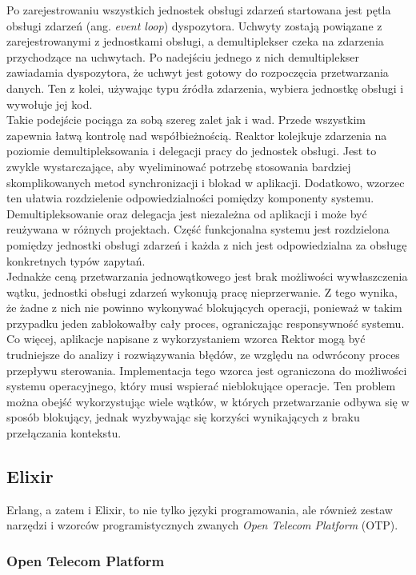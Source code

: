 \documentclass[12pt,twoside]{article}
\begin{document}
Po zarejestrowaniu wszystkich jednostek obsługi zdarzeń startowana jest
pętla obsługi zdarzeń (ang. \emph{event loop}) dyspozytora. Uchwyty
zostają powiązane z zarejestrowanymi z jednostkami obsługi, a
demultiplekser czeka na zdarzenia przychodzące na uchwytach. Po
nadejściu jednego z nich demultiplekser zawiadamia dyspozytora, że
uchwyt jest gotowy do rozpoczęcia przetwarzania danych. Ten z kolei,
używając typu źródła zdarzenia, wybiera jednostkę obsługi i wywołuje jej
kod.\\
Takie podejście pociąga za sobą szereg zalet jak i wad. Przede wszystkim
zapewnia łatwą kontrolę nad współbieżnością. Reaktor kolejkuje zdarzenia
na poziomie demultipleksowania i delegacji pracy do jednostek obsługi.
Jest to zwykle wystarczające, aby wyeliminować potrzebę stosowania
bardziej skomplikowanych metod synchronizacji i blokad w aplikacji.
Dodatkowo, wzorzec ten ułatwia rozdzielenie odpowiedzialności pomiędzy
komponenty systemu. Demultipleksowanie oraz delegacja jest niezależna od
aplikacji i może być reużywana w różnych projektach. Część funkcjonalna
systemu jest rozdzielona pomiędzy jednostki obsługi zdarzeń i każda z
nich jest odpowiedzialna za obsługę konkretnych typów zapytań.\\
Jednakże ceną przetwarzania jednowątkowego jest brak możliwości
wywłaszczenia wątku, jednostki obsługi zdarzeń wykonują pracę
nieprzerwanie. Z tego wynika, że żadne z nich nie powinno wykonywać
blokujących operacji, ponieważ w takim przypadku jeden zablokowałby cały
proces, ograniczając responsywność systemu. Co więcej, aplikacje
napisane z wykorzystaniem wzorca Rektor mogą być trudniejsze do analizy
i rozwiązywania błędów, ze względu na odwrócony proces przepływu
sterowania. Implementacja tego wzorca jest ograniczona do możliwości
systemu operacyjnego, który musi wspierać nieblokujące operacje. Ten
problem można obejść wykorzystując wiele wątków, w których przetwarzanie
odbywa się w sposób blokujący, jednak wyzbywając się korzyści
wynikających z braku przełączania
kontekstu.\autocite{schmidt1995reactor}

\subsection{Elixir}\label{architektura---elixir}

Erlang, a zatem i Elixir, to nie tylko języki programowania, ale również
zestaw narzędzi i wzorców programistycznych zwanych \emph{Open Telecom
Platform} (OTP).

\subsubsection{Open Telecom Platform}\label{open-telecom-platform}
\end{document}
